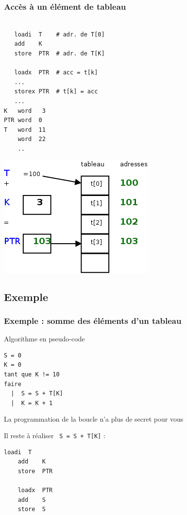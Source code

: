 \begin{frame}[containsverbatim]
\frametitle{Accès à un élément de tableau}
  \begin{multicols}{2}
\small
\begin{lstlisting}[frame=single]

   loadi  T    # adr. de T[0]
   add    K
   store  PTR  # adr. de T[K]

   loadx  PTR  # acc = t[k]
   ...
   storex PTR  # t[k] = acc
   ...
K   word   3
PTR word  0   
T   word  11
    word  22
    ..
\end{lstlisting}

\break
\includegraphics[width=0.8\linewidth]{figures/t100}
  \end{multicols}
\end{frame}



\subsection{Exemple}


\begin{frame}[containsverbatim]
  \frametitle{Exemple : somme des éléments d'un tableau}

\begin{multicols}{2}
\alert{Algorithme en pseudo-code}
\begin{lstlisting}
S = 0
K = 0
tant que K != 10
faire
  |  S = S + T[K]
  |  K = K + 1
\end{lstlisting}
\break
La programmation de la boucle n'a plus de secret pour vous


Il reste à réaliser \verb/ S = S + T[K]/ :
\begin{lstlisting}[frame=single]
    loadi  T
    add    K
    store  PTR

    loadx  PTR
    add    S
    store  S
\end{lstlisting}
\end{multicols}
\end{frame}

